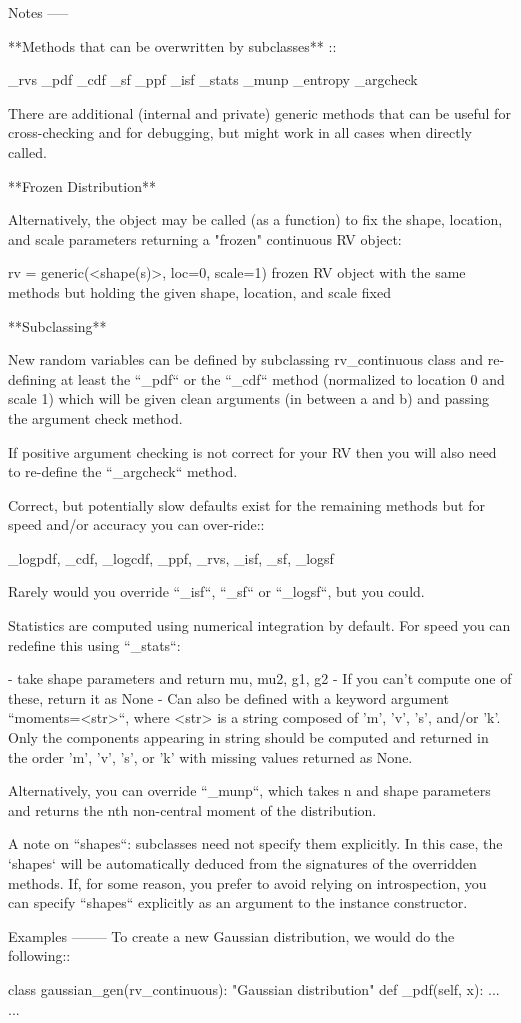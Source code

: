 \begin{DoxyVerb}
Notes
-----

**Methods that can be overwritten by subclasses**
::

  _rvs
  _pdf
  _cdf
  _sf
  _ppf
  _isf
  _stats
  _munp
  _entropy
  _argcheck

There are additional (internal and private) generic methods that can
be useful for cross-checking and for debugging, but might work in all
cases when directly called.

**Frozen Distribution**

Alternatively, the object may be called (as a function) to fix the shape,
location, and scale parameters returning a "frozen" continuous RV object:

rv = generic(<shape(s)>, loc=0, scale=1)
    frozen RV object with the same methods but holding the given shape,
    location, and scale fixed

**Subclassing**

New random variables can be defined by subclassing rv_continuous class
and re-defining at least the ``_pdf`` or the ``_cdf`` method (normalized
to location 0 and scale 1) which will be given clean arguments (in between
a and b) and passing the argument check method.

If positive argument checking is not correct for your RV
then you will also need to re-define the ``_argcheck`` method.

Correct, but potentially slow defaults exist for the remaining
methods but for speed and/or accuracy you can over-ride::

  _logpdf, _cdf, _logcdf, _ppf, _rvs, _isf, _sf, _logsf

Rarely would you override ``_isf``, ``_sf`` or ``_logsf``, but you could.

Statistics are computed using numerical integration by default.
For speed you can redefine this using ``_stats``:

 - take shape parameters and return mu, mu2, g1, g2
 - If you can't compute one of these, return it as None
 - Can also be defined with a keyword argument ``moments=<str>``,
   where <str> is a string composed of 'm', 'v', 's',
   and/or 'k'.  Only the components appearing in string
   should be computed and returned in the order 'm', 'v',
   's', or 'k'  with missing values returned as None.

Alternatively, you can override ``_munp``, which takes n and shape
parameters and returns the nth non-central moment of the distribution.

A note on ``shapes``: subclasses need not specify them explicitly. In this
case, the `shapes` will be automatically deduced from the signatures of the
overridden methods.
If, for some reason, you prefer to avoid relying on introspection, you can
specify ``shapes`` explicitly as an argument to the instance constructor.

Examples
--------
To create a new Gaussian distribution, we would do the following::

    class gaussian_gen(rv_continuous):
        "Gaussian distribution"
        def _pdf(self, x):
            ...
        ...\end{DoxyVerb}
 

